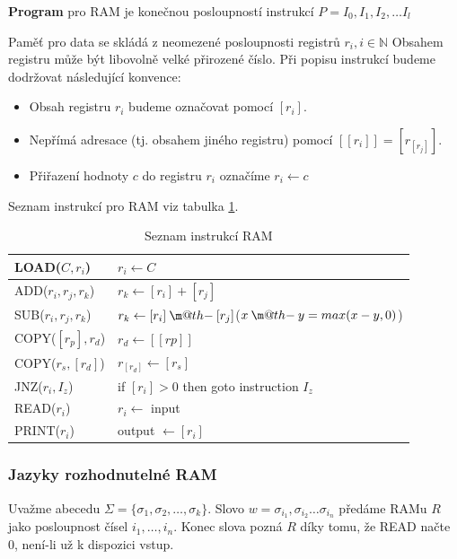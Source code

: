 \documentclass[11pt]{report} %
\makeatletter
\newcommand{\dotminus}{\mathbin{\text{\@dotminus}}}
\newcommand{\@dotminus}{%
	\ooalign{\hidewidth\raise1ex\hbox{.}\hidewidth\cr$\m@th-$\cr}%
}
\makeatother
\begin{document}
\textbf{Program} pro RAM je konečnou posloupností instrukcí $P = I_0, I_1, I_2, \dots I_l$

Paměť pro data se skládá z neomezené posloupnosti registrů $r_i, i \in \mathbb{N}$ Obsahem registru může být libovolně velké přirozené číslo. Při popisu instrukcí budeme dodržovat následující konvence:
\begin{itemize}
	\leftskip 20pt
	\setlength{\itemsep}{0pt}
	\item Obsah registru $r_i$ budeme označovat pomocí $[r_i]$.
	\item Nepřímá adresace (tj. obsahem jiného registru) pomocí $[[r_i]] = [r_{[r_j]}]$. 
	\item Přiřazení hodnoty $c$ do registru $r_i$ označíme $r_i \leftarrow c$
\end{itemize}

Seznam instrukcí pro RAM viz tabulka \ref{ram_instrukce}.
\begin{table}[H]
	\centering
	\renewcommand{\arraystretch}{1.5}
	\begin{tabular}{|l|l|}
		\hline
		LOAD($C, r_i$) 			& $r_i \leftarrow C$ 							\\ \hline
		ADD($r_i, r_j, r_k$) 	& $r_k \leftarrow [r_i] + [r_j]$				\\ \hline
		SUB($r_i, r_j, r_k$) 	& $r_k \leftarrow [r_i] \dotminus [r_j]$\quad ($x \dotminus y = max(x-y, 0)$)    	\\ \hline
		COPY($[r_p], r_d$) 		& $r_d \leftarrow [[rp]]$				 		\\ \hline
		COPY($r_s,[r_d]$) 		& $r_{[r_d]} \leftarrow [r_s]$                  \\ \hline
		JNZ($r_i, I_z$) 		& if $[r_i] > 0$ then goto instruction $I_z$ 	\\ \hline
		READ($r_i$) 			& $r_i \leftarrow$ input						\\ \hline
		PRINT($r_i$) 			& output $\leftarrow [r_i]$   					\\ \hline
	\end{tabular}
	\caption{Seznam instrukcí RAM}
	\label{ram_instrukce}
\end{table}

\subsubsection{Jazyky rozhodnutelné RAM}
Uvažme abecedu $\Sigma = \{\sigma_1, \sigma_2, \dots, \sigma_k\}$. Slovo $w = \sigma_{i_1}, \sigma_{i_2} \dots \sigma_{i_n}$ předáme RAMu $R$ jako posloupnost čísel $i_1, \dots, i_n$. Konec slova pozná $R$ díky tomu, že READ načte 0, není-li už k dispozici vstup.
\end{document}
